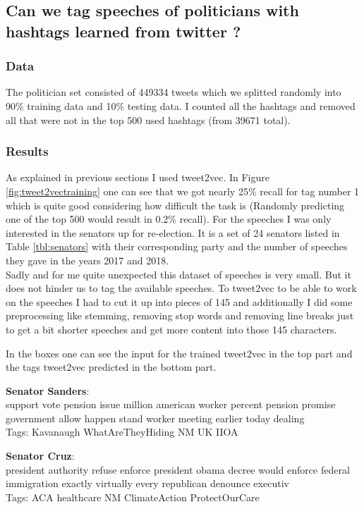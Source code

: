 \documentclass[10pt,conference,compsocconf]{IEEEtran}
\begin{document}
\subsection{Can we tag speeches of politicians with hashtags learned from twitter ? }
\subsubsection{Data}
The politician set consisted of 449334 tweets which we splitted randomly into 90\% training data and 10\% testing data. I counted all the hashtags and removed all that were not in the top 500 used hashtags (from 39671 total).  

\subsubsection{Results}

As explained in previous sections I used tweet2vec.  In Figure \ref{fig:tweet2vectraining} one can see that we got nearly 25\% recall for tag number 1 which is quite good considering how difficult the task is (Randomly predicting one of the top 500 would result in 0.2\% recall). For the speeches I was only interested in the senators up for re-election. It is a set of 24 senators listed in Table \ref{tbl:senators} with their corresponding party and the number of speeches they gave in the years 2017 and 2018. \\
Sadly and for me quite unexpected this dataset of speeches is very small.  But it does not hinder us to tag the available speeches. To tweet2vec to be able to work on the speeches I had to cut it up into pieces of 145 and additionally I did some preprocessing like stemming, removing stop words and removing line breaks just to get a bit shorter speeches and get more content into those 145 characters. 

In the boxes one can see the input for the trained tweet2vec in the top part and the tags tweet2vec predicted in the bottom part. 

\begin{framed}
	\textbf{Senator Sanders}: \\
	support vote pension issue million american worker percent pension promise government allow happen stand worker meeting earlier today dealing \\
	Tags: Kavanaugh WhatAreTheyHiding NM UK IIOA
\end{framed}
\begin{framed}
	\textbf{Senator Cruz}: \\
 president authority refuse enforce president obama decree would enforce federal immigration exactly virtually every republican denounce executiv
 \\
	Tags: ACA healthcare NM ClimateAction ProtectOurCare
\end{framed}
\end{document}
